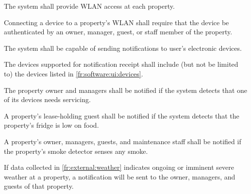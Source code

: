 \documentclass[letter,titlepage,oneside,english]{report}
\begin{document}
\begin{fr}
\begin{fr}
\begin{fr}
    \end{fr}
  \end{fr}
\item
  The system shall provide WLAN access at each property.
  \begin{fr}
  \item
    Connecting a device to a property's WLAN shall require that the device be authenticated by an owner, manager, guest, or staff member of the property.
  \end{fr}
\item
  The system shall be capable of sending notifications to user's electronic devices.
  \begin{fr}
  \item
    The devices supported for notification receipt shall include (but not be limited to) the devices listed in \ref{fr:software:ui:devices}.
  \item
    The property owner and managers shall be notified if the system detects that one of its devices needs servicing.
  \item
    A property's lease-holding guest shall be notified if the system detects that the property's fridge is low on food.
  \item
    A property's owner, managers, guests, and maintenance staff shall be notified if the property's smoke detector senses any smoke.
  \item
    If data collected in \ref{fr:external:weather} indicates ongoing or imminent severe weather at a property, a notification will be sent to the owner, managers, and guests of that property.
  \end{fr}
\end{fr}
\end{document}
